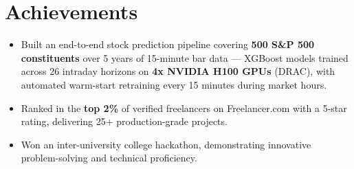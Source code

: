 \documentclass[letterpaper,11pt]{article}
\newcommand{\resumeItem}[1]{
  \item\small{#1 \vspace{-2pt}}
}
\begin{document}
\section{Achievements}
\begin{itemize}[leftmargin=0.15in]
    \resumeItem{Built an end-to-end stock prediction pipeline covering \textbf{500 S\&P 500 constituents} over 5 years of 15-minute bar data --- XGBoost models trained across 26 intraday horizons on \textbf{4x NVIDIA H100 GPUs} (DRAC), with automated warm-start retraining every 15 minutes during market hours.}
    \resumeItem{Ranked in the \textbf{top 2\%} of verified freelancers on Freelancer.com with a 5-star rating, delivering 25+ production-grade projects.}
    \resumeItem{Won an inter-university college hackathon, demonstrating innovative problem-solving and technical proficiency.}
\end{itemize}
\end{document}
